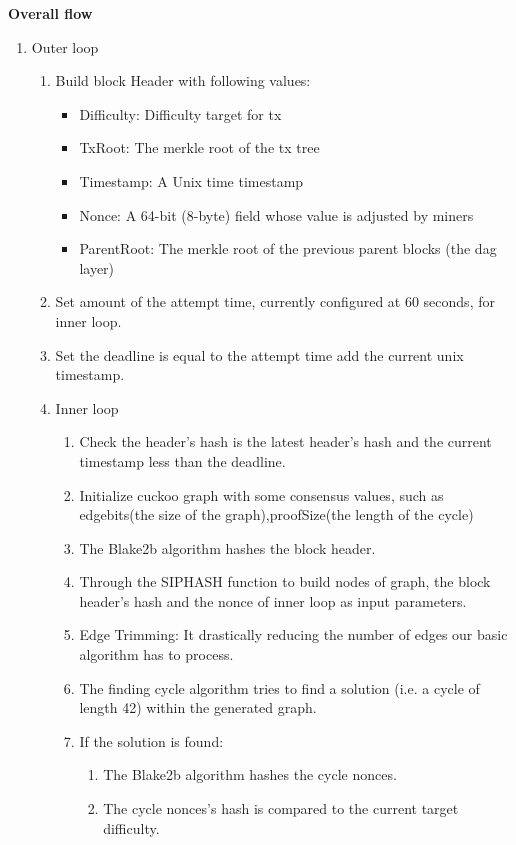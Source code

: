 \documentclass[a4paper,11pt]{article}
\begin{document}
\textbf{Overall flow}

\begin{enumerate}
	
\item Outer loop

\begin{enumerate}
	\item Build block Header with following values:
	
		\begin{itemize}
		\item Difficulty: Difficulty target for tx
		\item TxRoot: The merkle root of the tx tree
		\item Timestamp: A Unix time timestamp
		\item Nonce: A 64-bit (8-byte) field whose value is adjusted by miners
		\item ParentRoot: The merkle root of the previous parent blocks (the dag layer)
		\end{itemize}
	
	\item Set amount of the attempt time, currently configured at 60 seconds, for inner loop.
	\item Set the deadline is equal to the attempt time add the current unix timestamp.
	\item Inner loop
	
		\begin{enumerate}
			\item Check the header’s hash is the latest header’s hash and the current timestamp less than the deadline.
			\item Initialize cuckoo graph with some consensus values, such as edgebits(the size of the graph),proofSize(the length of the cycle)
			\item The Blake2b algorithm hashes the block header.
			\item Through the SIPHASH function to build nodes of graph, the block header’s hash and the nonce of inner loop as input parameters.
			\item Edge Trimming: It drastically reducing the number of edges our basic algorithm has to process.
			\item The finding cycle algorithm tries to find a solution (i.e. a cycle of length 42) within the generated graph.
			\item If the solution is found:
			
			\begin{enumerate}
				\item The Blake2b algorithm hashes the cycle nonces.
				\item The cycle nonces’s hash is compared to the current target difficulty.
			\end{enumerate}
		

\end{enumerate}
\end{enumerate}
\end{enumerate}
\end{document}
